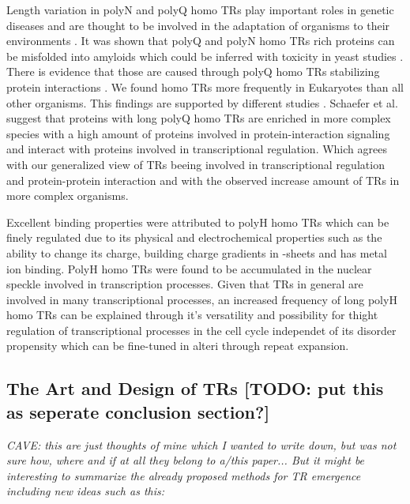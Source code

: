 \documentclass[a4,center,fleqn]{NAR}
\begin{document}
Length variation in polyN and polyQ homo TRs play important roles in genetic diseases and are thought to be involved in the adaptation of organisms to their environments \cite{Caprioli2012, Undurraga2012, Michael2007}.
It was shown that polyQ and polyN homo TRs rich proteins can be misfolded into amyloids which could be inferred with toxicity in yeast studies \cite{Kochneva2012, Alexandrov2013, Gong2012}. 
There is evidence that those are caused through polyQ homo TRs stabilizing protein interactions \cite{Schaefer2012}.
We found homo TRs more frequently in Eukaryotes than all other organisms. This findings are supported by different studies \cite{Schaefer2012, Huntley2002}.
Schaefer et al. \cite{Schaefer2012} suggest that proteins with long polyQ homo TRs are enriched in more complex species with a high amount of proteins involved in protein-interaction signaling and interact with proteins involved in transcriptional regulation. Which agrees with our generalized view of TRs beeing involved in transcriptional regulation and protein-protein interaction and with the observed increase amount of TRs in more complex organisms.

Excellent binding properties were attributed to polyH homo TRs \cite{Salichs2009} which can be finely regulated due to its physical and electrochemical properties such as the ability to change its charge, building charge gradients in \beta -sheets and has metal ion binding. PolyH homo TRs were found to be accumulated in the nuclear speckle involved in transcription processes.
Given that TRs in general are involved in many transcriptional processes, an increased frequency of long polyH homo TRs can be explained through it's versatility and possibility for thight regulation of transcriptional processes in the cell cycle independet of its disorder propensity which can be fine-tuned in alteri through repeat expansion.

\subsection{The Art and Design of TRs [TODO: put this as seperate conclusion section?]}
\textit{CAVE: this are just thoughts of mine which I wanted to write down, but was not sure how, where and if at all they belong to a/this paper... But it might be interesting to summarize the already proposed methods for TR emergence including new ideas such as this:}
\end{document}
